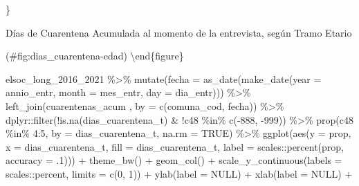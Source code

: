 \documentclass[
  12pt,
]{book}
\newenvironment{Shaded}{\begin{snugshade}}{\end{snugshade}}
\newcommand{\AttributeTok}[1]{\textcolor[rgb]{0.77,0.63,0.00}{#1}}
\newcommand{\ConstantTok}[1]{\textcolor[rgb]{0.00,0.00,0.00}{#1}}
\newcommand{\DecValTok}[1]{\textcolor[rgb]{0.00,0.00,0.81}{#1}}
\newcommand{\FunctionTok}[1]{\textcolor[rgb]{0.00,0.00,0.00}{#1}}
\newcommand{\NormalTok}[1]{#1}
\newcommand{\SpecialCharTok}[1]{\textcolor[rgb]{0.00,0.00,0.00}{#1}}
\newcommand{\StringTok}[1]{\textcolor[rgb]{0.31,0.60,0.02}{#1}}
\begin{document}
\}

\caption{Días de Cuarentena Acumulada al momento de la entrevista, según Tramo Etario}

(\#fig:dias\_cuarentena-edad)
\textbackslash end\{figure\}

\begin{Shaded}
\begin{Highlighting}[]
\NormalTok{elsoc\_long\_2016\_2021 }\SpecialCharTok{\%\textgreater{}\%} 
  \FunctionTok{mutate}\NormalTok{(}\AttributeTok{fecha =} \FunctionTok{as\_date}\NormalTok{(}\FunctionTok{make\_date}\NormalTok{(}\AttributeTok{year =}\NormalTok{ annio\_entr, }\AttributeTok{month =}\NormalTok{ mes\_entr, }\AttributeTok{day =}\NormalTok{ dia\_entr))) }\SpecialCharTok{\%\textgreater{}\%} 
  \FunctionTok{left\_join}\NormalTok{(cuarentenas\_acum , }\AttributeTok{by =} \FunctionTok{c}\NormalTok{(}\StringTok{\textquotesingle{}comuna\_cod\textquotesingle{}}\NormalTok{, }\StringTok{\textquotesingle{}fecha\textquotesingle{}}\NormalTok{)) }\SpecialCharTok{\%\textgreater{}\%} 
\NormalTok{  dplyr}\SpecialCharTok{::}\FunctionTok{filter}\NormalTok{(}\SpecialCharTok{!}\FunctionTok{is.na}\NormalTok{(dias\_cuarentena\_t) }\SpecialCharTok{\&} \SpecialCharTok{!}\NormalTok{c48 }\SpecialCharTok{\%in\%} \FunctionTok{c}\NormalTok{(}\SpecialCharTok{{-}}\DecValTok{888}\NormalTok{, }\SpecialCharTok{{-}}\DecValTok{999}\NormalTok{)) }\SpecialCharTok{\%\textgreater{}\%} 
  \FunctionTok{prop}\NormalTok{(c48 }\SpecialCharTok{\%in\%} \DecValTok{4}\SpecialCharTok{:}\DecValTok{5}\NormalTok{, }\AttributeTok{by =}\NormalTok{ dias\_cuarentena\_t, }\AttributeTok{na.rm =} \ConstantTok{TRUE}\NormalTok{) }\SpecialCharTok{\%\textgreater{}\%} 
  \FunctionTok{ggplot}\NormalTok{(}\FunctionTok{aes}\NormalTok{(}\AttributeTok{y =}\NormalTok{ prop, }\AttributeTok{x =}\NormalTok{ dias\_cuarentena\_t, }\AttributeTok{fill =}\NormalTok{ dias\_cuarentena\_t, }
             \AttributeTok{label =}\NormalTok{ scales}\SpecialCharTok{::}\FunctionTok{percent}\NormalTok{(prop, }\AttributeTok{accuracy =}\NormalTok{ .}\DecValTok{1}\NormalTok{))) }\SpecialCharTok{+} 
  \FunctionTok{theme\_bw}\NormalTok{() }\SpecialCharTok{+} 
  \FunctionTok{geom\_col}\NormalTok{() }\SpecialCharTok{+}
  \FunctionTok{scale\_y\_continuous}\NormalTok{(}\AttributeTok{labels =}\NormalTok{ scales}\SpecialCharTok{::}\NormalTok{percent, }\AttributeTok{limits =} \FunctionTok{c}\NormalTok{(}\DecValTok{0}\NormalTok{, }\DecValTok{1}\NormalTok{)) }\SpecialCharTok{+}
  \FunctionTok{ylab}\NormalTok{(}\AttributeTok{label =} \ConstantTok{NULL}\NormalTok{) }\SpecialCharTok{+}
  \FunctionTok{xlab}\NormalTok{(}\AttributeTok{label =} \ConstantTok{NULL}\NormalTok{) }\SpecialCharTok{+}

\end{Highlighting}
\end{Shaded}
\end{document}
